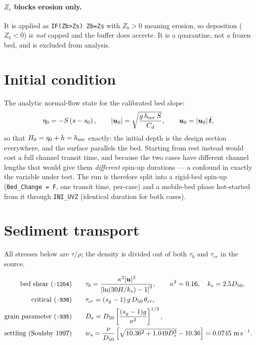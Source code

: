 \documentclass[11pt,a4paper]{article}
\newcommand{\code}[1]{\texttt{\small #1}}
\begin{document}
\paragraph{$Z_s$ blocks erosion only.} It is applied as
\code{IF(Zb>Zs) Zb=Zs} with $Z_b>0$ meaning erosion, so deposition ($Z_b<0$) is
\emph{not} capped and the buffer does accrete. It is a quarantine, not a frozen bed, and
is excluded from analysis.

\section{Initial condition}

The analytic normal-flow state for the calibrated bed slope:
\begin{equation}
  \eta_0=-S\left(s-s_0\right),\qquad
  |\bm u_0|=\sqrt{\frac{g\,h_{\rm sec}\,S}{C_d}},\qquad
  \bm u_0=|\bm u_0|\,\hat{\bm t},
  \label{eq:ic}
\end{equation}
so that $H_0=\eta_0+h=h_{\rm sec}$ exactly: the initial depth is the design section
everywhere, and the surface parallels the bed. Starting from rest instead would cost a
full channel transit time, and because the two cases have different channel lengths that
would give them \emph{different} spin-up durations --- a confound in exactly the variable
under test. The run is therefore split into a rigid-bed spin-up
(\code{Bed\_Change = F}, one transit time, per-case) and a mobile-bed phase hot-started
from it through \code{INI\_UVZ} (identical duration for both cases).

\section{Sediment transport}
\label{sec:sed}

All stresses below are $\tau/\rho$; the density is divided out of both $\tau_b$ and
$\tau_{cr}$ in the source.

\begin{align}
  \text{bed shear (\code{:1254})}\qquad
    &\tau_b=\frac{\kappa^2|\bm u|^2}{\left[\ln(30H/k_s)-1\right]^2},
     \qquad \kappa^2=0.16,\quad k_s=2.5D_{50}, \label{eq:tau}\\
  \text{critical (\code{:936})}\qquad
    &\tau_{cr}=(s_g-1)\,g\,D_{50}\,\theta_{cr}, \label{eq:taucr}\\
  \text{grain parameter (\code{:935})}\qquad
    &D_*=D_{50}\left[\frac{(s_g-1)g}{\nu^2}\right]^{1/3}, \\
  \text{settling (Soulsby 1997)}\qquad
    &w_s=\frac{\nu}{D_{50}}\left[\sqrt{10.36^2+1.049D_*^3}-10.36\right]
     =0.0745\ \mathrm{m\,s^{-1}}.
\end{align}
\end{document}
